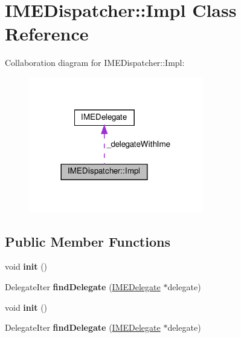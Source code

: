\hypertarget{classIMEDispatcher_1_1Impl}{}\section{I\+M\+E\+Dispatcher\+:\+:Impl Class Reference}
\label{classIMEDispatcher_1_1Impl}


Collaboration diagram for I\+M\+E\+Dispatcher\+:\+:Impl\+:
\nopagebreak
\begin{figure}[H]
\begin{center}
\leavevmode
\includegraphics[width=216pt]{classIMEDispatcher_1_1Impl__coll__graph}
\end{center}
\end{figure}
\subsection*{Public Member Functions}
\begin{DoxyCompactItemize}
\item 
\mbox{\label{classIMEDispatcher_1_1Impl_a32a5e8fc69d8ced3c936219fab9f188a}} 
void {\bfseries init} ()
\item 
\mbox{\label{classIMEDispatcher_1_1Impl_a143de3398ac01d328a76190bdf95b91f}} 
Delegate\+Iter {\bfseries find\+Delegate} (\hyperlink{classIMEDelegate}{I\+M\+E\+Delegate} $\ast$delegate)
\item 
\mbox{\label{classIMEDispatcher_1_1Impl_a32a5e8fc69d8ced3c936219fab9f188a}} 
void {\bfseries init} ()
\item 
\mbox{\label{classIMEDispatcher_1_1Impl_a143de3398ac01d328a76190bdf95b91f}} 
Delegate\+Iter {\bfseries find\+Delegate} (\hyperlink{classIMEDelegate}{I\+M\+E\+Delegate} $\ast$delegate)
\end{DoxyCompactItemize}
